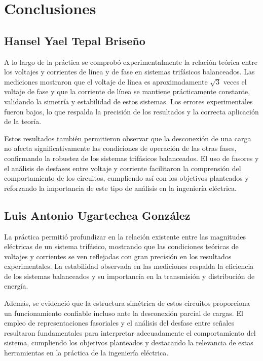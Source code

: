 \documentclass[12pt, letterpaper]{article}
\begin{document}
\section{Conclusiones}

\subsection{Hansel Yael Tepal Briseño}

A lo largo de la práctica se comprobó experimentalmente la relación teórica entre los voltajes y corrientes de línea y de fase en sistemas trifásicos balanceados. Las mediciones mostraron que el voltaje de línea es aproximadamente $\sqrt{3}$ veces el voltaje de fase y que la corriente de línea se mantiene prácticamente constante, validando la simetría y estabilidad de estos sistemas. Los errores experimentales fueron bajos, lo que respalda la precisión de los resultados y la correcta aplicación de la teoría.

Estos resultados también permitieron observar que la desconexión de una carga no afecta significativamente las condiciones de operación de las otras fases, confirmando la robustez de los sistemas trifásicos balanceados. El uso de fasores y el análisis de desfases entre voltaje y corriente facilitaron la comprensión del comportamiento de los circuitos, cumpliendo así con los objetivos planteados y reforzando la importancia de este tipo de análisis en la ingeniería eléctrica.

\subsection{Luis Antonio Ugartechea González}

La práctica permitió profundizar en la relación existente entre las magnitudes eléctricas de un sistema trifásico, mostrando que las condiciones teóricas de voltajes y corrientes se ven reflejadas con gran precisión en los resultados experimentales. La estabilidad observada en las mediciones respalda la eficiencia de los sistemas balanceados y su importancia en la transmisión y distribución de energía.

Además, se evidenció que la estructura simétrica de estos circuitos proporciona un funcionamiento confiable incluso ante la desconexión parcial de cargas. El empleo de representaciones fasoriales y el análisis del desfase entre señales resultaron fundamentales para interpretar adecuadamente el comportamiento del sistema, cumpliendo los objetivos planteados y destacando la relevancia de estas herramientas en la práctica de la ingeniería eléctrica.
\end{document}
